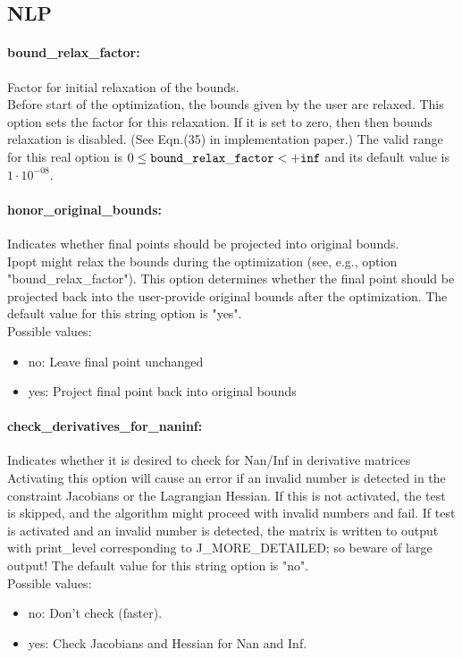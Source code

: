 \subsection{NLP}

\paragraph{bound\_relax\_factor:}\label{opt:bound_relax_factor} Factor for initial relaxation of the bounds. \\
 Before start of the optimization, the bounds
given by the user are relaxed.  This option sets
the factor for this relaxation.  If it is set to
zero, then then bounds relaxation is disabled.
(See Eqn.(35) in implementation paper.) The valid range for this real option is 
$0 \le {\tt bound\_relax\_factor } <  {\tt +inf}$
and its default value is $1 \cdot 10^{-08}$.


\paragraph{honor\_original\_bounds:}\label{opt:honor_original_bounds} Indicates whether final points should be projected into original bounds. \\
 Ipopt might relax the bounds during the
optimization (see, e.g., option
"bound\_relax\_factor").  This option determines
whether the final point should be projected back
into the user-provide original bounds after the
optimization. The default value for this string option is "yes".
\\ 
Possible values:
\begin{itemize}
   \item no: Leave final point unchanged
   \item yes: Project final point back into original bounds
\end{itemize}

\paragraph{check\_derivatives\_for\_naninf:}\label{opt:check_derivatives_for_naninf} Indicates whether it is desired to check for Nan/Inf in derivative matrices \\
 Activating this option will cause an error if an
invalid number is detected in the constraint
Jacobians or the Lagrangian Hessian.  If this is
not activated, the test is skipped, and the
algorithm might proceed with invalid numbers and
fail.  If test is activated and an invalid number
is detected, the matrix is written to output with
print\_level corresponding to J\_MORE\_DETAILED;
so beware of large output! The default value for this string option is "no".
\\ 
Possible values:
\begin{itemize}
   \item no: Don't check (faster).
   \item yes: Check Jacobians and Hessian for Nan and Inf.
\end{itemize}

